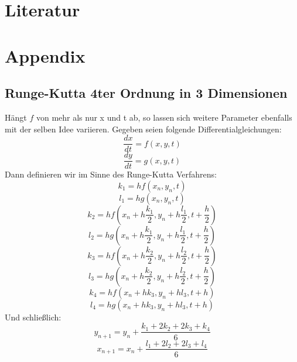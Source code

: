 \documentclass[12pt,a4paper]{article}
\begin{document}
\section{ Literatur }
\nocite{*}
\printbibliography
\pagebreak
\section{Appendix}

\subsection {Runge-Kutta 4ter Ordnung in 3 Dimensionen}
Hängt $f$ von mehr als nur x und t ab, so lassen sich weitere Parameter ebenfalls mit der selben Idee variieren.
Gegeben seien folgende Differentialgleichungen:
$$\frac{dx}{dt}=f(x,y,t)$$
$$\frac{dy}{dt}=g(x,y,t)$$
Dann definieren wir im Sinne des Runge-Kutta Verfahrens:
$$k_1 = hf(x_n,y_n,t)$$
$$l_1 = hg(x_n,y_n,t)$$
$$k_2 = hf(x_n+h\frac{k_1}{2},y_n+h\frac{l_1}{2},t+\frac{h}{2})$$
$$l_2 = hg(x_n+h\frac{k_1}{2},y_n+h\frac{l_1}{2},t+\frac{h}{2})$$
$$k_3 = hf(x_n+h\frac{k_2}{2},y_n+h\frac{l_2}{2},t+\frac{h}{2})$$
$$l_3 = hg(x_n+h\frac{k_2}{2},y_n+h\frac{l_2}{2},t+\frac{h}{2})$$
$$k_4 = hf(x_n+hk_3,y_n+hl_3,t+h)$$
$$l_4 = hg(x_n+hk_3,y_n+hl_3,t+h)$$
Und schließlich:
$$y_{n+1} = y_n + \frac{k_1 + 2k_2 + 2k_3 + k_4}{6}$$
$$x_{n+1} = x_n + \frac{l_1 + 2l_2 + 2l_3 + l_4}{6}$$
\end{document}
